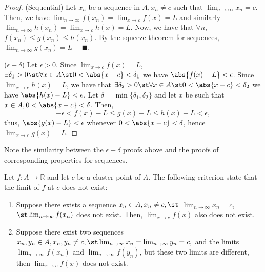 \documentclass[12pt]{article}
\renewcommand{\qedsymbol}{$\blacksquare$}
\begin{document}
\begin{proof}
  (Sequential) Let $x_n$ be a sequence in $A, x_n \neq c$ such that $\lim_{n\to\infty} x_n = c$. Then, we have $\lim_{n\to\infty} f(x_n) = \lim_{x \to c} f(x) = L$ and similarly $\lim_{n\to\infty} h(x_n) = \lim_{x \to c} h(x) = L$. Now, we have that $\forall n,$ $f(x_n) \leq g(x_n) \leq h(x_n)$. By the squeeze theorem for sequences, $\lim_{n\to\infty} g(x_n) = L \quad$ \qedsymbol.

  \noindent ($\epsilon-\delta$) Let $\epsilon > 0$. Since $\lim_{x\to c} f(x) = L$, $\exists \delta_1 > 0 \st \forall x \in A \st 0 < \abs{x - c} < \delta_1$ we have $\abs{f(x) - L}< \epsilon$. Since $\lim_{x \to c} h(x) = L$, we have that $\exists \delta_2>0 \st \forall x \in A \st 0 < \abs{x - c} < \delta_2$ we have $\abs{h(x) - L} < \epsilon$. Let $\delta = \min\{\delta_1, \delta_2\}$ and let $x$ be such that $x \in A, 0 < \abs{x - c} < \delta$. Then, \[
    - \epsilon < f(x) - L \leq g(x) - L \leq h(x) - L < \epsilon,
    \]
    thus, $\abs{g(x) - L} < \epsilon$ whenever $0 < \abs{x - c} < \delta$, hence $\lim_{x \to c} g(x) = L$.
\end{proof}
\begin{remark}
  Note the similarity between the $\epsilon-\delta$ proofs above and the proofs of corresponding properties for sequences.
\end{remark}

\begin{definition}
  Let $f : A \to \mathbb{R}$ and let $c$ be a cluster point of $A$. The following criterion state that the limit of $f$ at $c$ does not exist:
  \begin{enumerate}
    \item Suppose there exists a sequence $x_n \in A, x_n \neq c, \st$ $\lim_{n \to \infty} x_n = c$, \newline$\st \lim_{n \to \infty} f(x_n)$ does not exist. Then, $\lim_{x \to c} f(x)$ also does not exist.
    \item  Suppose there exist two sequences $x_n, y_n \in A, x_n, y_n \neq c, \st \lim_{n\to\infty} x_n = \lim_{n\to\infty} y_n = c,$ and the limits $\lim_{n\to\infty} f(x_n)$ and $\lim_{n\to\infty} f(y_n)$, but these two limits are different, then $\lim_{x\to c} f(x)$ does not exist.
  \end{enumerate}
\end{definition}
\end{document}
